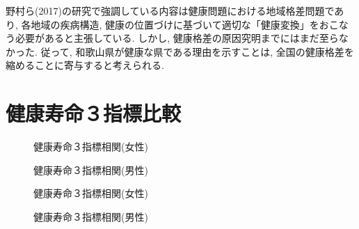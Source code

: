 野村ら(2017)の研究で強調している内容は健康問題における地域格差問題であり, 各地域の疾病構造, 健康の位置づけに基づいて適切な「健康変換」をおこなう必要があると主張している. しかし, 健康格差の原因究明までにはまだ至らなかった. 従って, 和歌山県が健康な県である理由を示すことは, 全国の健康格差を縮めることに寄与すると考えられる.

%

\section{健康寿命３指標比較}
\begin{figure}[h!]
	\begin{center}
		\caption{健康寿命３指標相関(女性)}
	\end{center}
\end{figure}

\begin{figure}[h!]
	\begin{center}
		\caption{健康寿命３指標相関(男性)}
	\end{center}
\end{figure}



\begin{figure}[h!]
	\begin{center}
		\caption{健康寿命３指標相関(女性)}
	\end{center}
\end{figure}



\begin{figure}[h!]
	\begin{center}
		\caption{健康寿命３指標相関(男性)}
	\end{center}
\end{figure}

